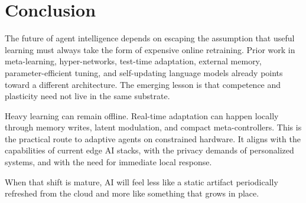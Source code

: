 \documentclass[11pt,a4paper]{article}
\begin{document}
\section{Conclusion}

The future of agent intelligence depends on escaping the assumption that useful learning must always take the form of expensive online retraining. Prior work in meta-learning, hyper-networks, test-time adaptation, external memory, parameter-efficient tuning, and self-updating language models already points toward a different architecture. The emerging lesson is that competence and plasticity need not live in the same substrate.

Heavy learning can remain offline. Real-time adaptation can happen locally through memory writes, latent modulation, and compact meta-controllers. This is the practical route to adaptive agents on constrained hardware. It aligns with the capabilities of current edge AI stacks, with the privacy demands of personalized systems, and with the need for immediate local response.

When that shift is mature, AI will feel less like a static artifact periodically refreshed from the cloud and more like something that grows in place.
\end{document}

